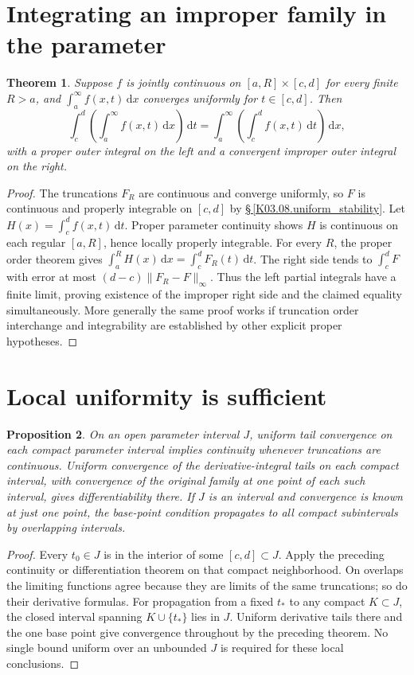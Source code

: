 \documentclass[11pt,oneside,a4paper]{book}
\newtheorem{theorem}{Theorem}[chapter]
\newtheorem{proposition}[theorem]{Proposition}
\theoremstyle{definition}
\theoremstyle{remark}
\newcommand{\dd}{\,\mathrm d}
\newcommand{\KEntry}[2]{\Needspace{7\baselineskip}\section{#2}\label{#1}{\small\sffamily\color{black!60}\detokenize{#1}}\par}
\newcommand{\KRef}[1]{\hyperref[#1]{\S\,\ref*{#1}}}
\begin{document}
\KEntry{K03.14.parameter_order}{Integrating an improper family in the parameter}
\begin{theorem}
Suppose $f$ is jointly continuous on $[a,R]\times[c,d]$ for every
finite $R>a$, and $\int_a^\infty f(x,t)\dd x$ converges uniformly
for $t\in[c,d]$. Then
\[\int_c^d\left(\int_a^\infty f(x,t)\dd x\right)\dd t
=\int_a^\infty\left(\int_c^df(x,t)\dd t\right)\dd x,
\]
with a proper outer integral on the left and a convergent improper
outer integral on the right.
\end{theorem}
\begin{proof}
The truncations $F_R$ are continuous and converge uniformly, so $F$ is
continuous and properly integrable on $[c,d]$ by
\KRef{K03.08.uniform_stability}. Let
$H(x)=\int_c^df(x,t)\dd t$. Proper parameter continuity shows $H$
is continuous on each regular $[a,R]$, hence locally properly integrable.
For every $R$, the proper order theorem gives
$\int_a^RH(x)\dd x=\int_c^dF_R(t)\dd t$.
The right side tends to $\int_c^dF$ with error at most
$(d-c)\|F_R-F\|_\infty$. Thus the left partial integrals have a
finite limit, proving existence of the improper right side and the
claimed equality simultaneously. More generally the same proof works
if truncation order interchange and integrability are established by
other explicit proper hypotheses.
\end{proof}

\KEntry{K03.14.local_uniform}{Local uniformity is sufficient}
\begin{proposition}
On an open parameter interval $J$, uniform tail convergence on each
compact parameter interval implies continuity whenever truncations are
continuous. Uniform convergence of the derivative-integral tails on
each compact interval, with convergence of the original family at one
point of each such interval, gives differentiability there. If $J$ is
an interval and convergence is known at just one point, the base-point
condition propagates to all compact subintervals by overlapping intervals.
\end{proposition}
\begin{proof}
Every $t_0\in J$ is in the interior of some $[c,d]\subset J$.
Apply the preceding continuity or differentiation theorem on that
compact neighborhood. On overlaps the limiting functions agree because
they are limits of the same truncations; so do their derivative formulas.
For propagation from a fixed $t_*$ to any compact $K\subset J$, the
closed interval spanning $K\cup\{t_*\}$ lies in $J$. Uniform derivative
tails there and the one base point give convergence throughout by the
preceding theorem. No single bound uniform over an unbounded $J$ is
required for these local conclusions.
\end{proof}
\end{document}
